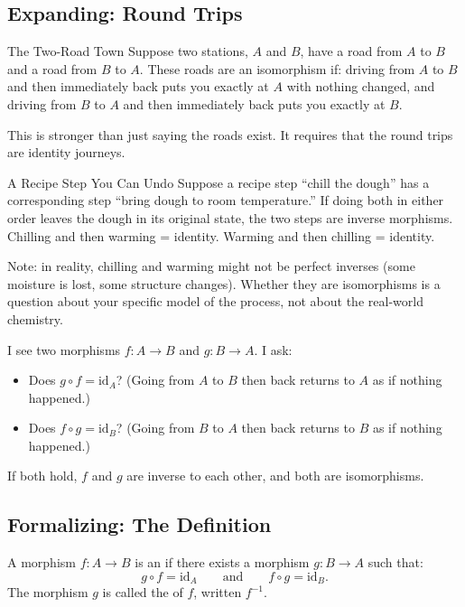 \subsection{Expanding: Round Trips}

\begin{example}{The Two-Road Town}
Suppose two stations, $A$ and $B$, have a road from $A$ to $B$ and a road
from $B$ to $A$. These roads are an isomorphism if: driving from $A$ to $B$
and then immediately back puts you exactly at $A$ with nothing changed, and
driving from $B$ to $A$ and then immediately back puts you exactly at $B$.

This is stronger than just saying the roads exist. It requires that the
round trips are identity journeys.
\end{example}

\begin{example}{A Recipe Step You Can Undo}
Suppose a recipe step ``chill the dough'' has a corresponding step ``bring
dough to room temperature.'' If doing both in either order leaves the dough
in its original state, the two steps are inverse morphisms. Chilling and
then warming = identity. Warming and then chilling = identity.

Note: in reality, chilling and warming might not be perfect inverses
(some moisture is lost, some structure changes). Whether they are isomorphisms
is a question about your specific model of the process, not about the
real-world chemistry.
\end{example}

\begin{dialog}
I see two morphisms $f : A \to B$ and $g : B \to A$. I ask:
\begin{itemize}
  \item Does $g \circ f = \mathrm{id}_A$? (Going from $A$ to $B$ then back
        returns to $A$ as if nothing happened.)
  \item Does $f \circ g = \mathrm{id}_B$? (Going from $B$ to $A$ then back
        returns to $B$ as if nothing happened.)
\end{itemize}
If both hold, $f$ and $g$ are inverse to each other, and both are
isomorphisms.
\end{dialog}

\subsection{Formalizing: The Definition}

A morphism $f : A \to B$ is an  if there exists a morphism
$g : B \to A$ such that:
\[
  g \circ f = \mathrm{id}_A \qquad \text{and} \qquad f \circ g = \mathrm{id}_B.
\]
The morphism $g$ is called the  of $f$, written $f^{-1}$.

